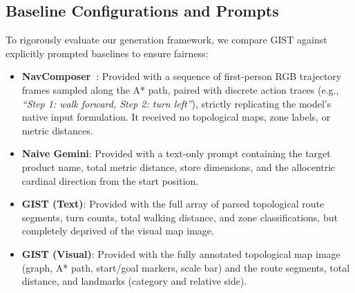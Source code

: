 \documentclass[sigconf,anonymous,review]{acmart}
\begin{document}
\begin{table}[h]
\centering
\caption{The 15 Benchmark Navigation Scenarios used for evaluation, spanning culturally specific product categories.}
\label{tab:scenarios}
\end{table}

\subsection{Baseline Configurations and Prompts}
To rigorously evaluate our generation framework, we compare GIST against explicitly prompted baselines to ensure fairness:
\begin{itemize}[leftmargin=*]
    \item \textbf{NavComposer~\cite{he2025navcomposer}}: Provided with a sequence of first-person RGB trajectory frames sampled along the A* path, paired with discrete action traces (e.g., \emph{``Step 1: walk forward, Step 2: turn left''}), strictly replicating the model's native input formulation. It received no topological maps, zone labels, or metric distances.
    \item \textbf{Naive Gemini}: Provided with a text-only prompt containing the target product name, total metric distance, store dimensions, and the allocentric cardinal direction from the start position.
    \item \textbf{GIST (Text)}: Provided with the full array of parsed topological route segments, turn counts, total walking distance, and zone classifications, but completely deprived of the visual map image.
    \item \textbf{GIST (Visual)}: Provided with the fully annotated topological map image (graph, A* path, start/goal markers, scale bar) and the route segments, total distance, and landmarks (category and relative side).
\end{itemize}
\end{document}

